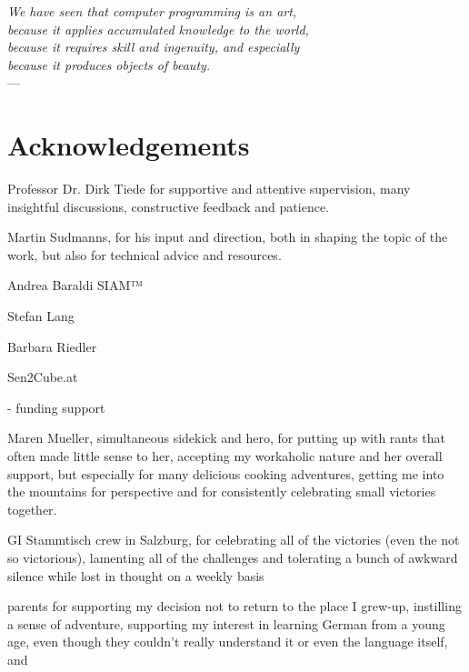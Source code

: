 \cleardoublepage
{}

\begin{flushright}{\slshape
    We have seen that computer programming is an art, \\
    because it applies accumulated knowledge to the world, \\
    because it requires skill and ingenuity, and especially \\
    because it produces objects of beauty.} \\ \medskip
    ---  \citep{knuth:1974}
\end{flushright}



\bigskip

\begingroup
\let\clearpage\relax
\let\cleardoublepage\relax
\let\cleardoublepage\relax
\chapter*{Acknowledgements}
Professor Dr. Dirk Tiede for supportive and attentive supervision, many insightful discussions, constructive feedback and patience.

Martin Sudmanns, for his input and direction, both in shaping the topic of the work, but also for technical advice and resources.

Andrea Baraldi SIAM™

Stefan Lang

Barbara Riedler

Sen2Cube.at

- funding support

Maren Mueller, simultaneous sidekick and hero, for putting up with rants that often made little sense to her, accepting my workaholic nature and her overall support, but especially for many delicious cooking adventures, getting me into the mountains for perspective and for consistently celebrating small victories together.

GI Stammtisch crew in Salzburg, for celebrating all of the victories (even the not so victorious), lamenting all of the challenges and tolerating a bunch of awkward silence while lost in thought on a weekly basis

parents for supporting my decision not to return to the place I grew-up, instilling a sense of adventure, supporting my interest in learning German from a young age, even though they couldn't really understand it or even the language itself, and

\endgroup
